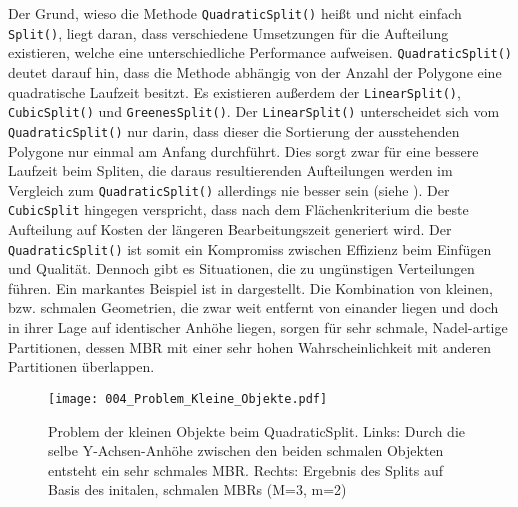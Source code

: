 \documentclass[runningheads,a4paper]{llncs}
\begin{document}
	Der Grund, wieso die Methode \texttt{QuadraticSplit()} heißt und nicht einfach \texttt{Split()}, liegt daran, dass verschiedene Umsetzungen für die Aufteilung existieren, welche eine unterschiedliche Performance aufweisen. \texttt{QuadraticSplit()} deutet darauf hin, dass die Methode abhängig von der Anzahl der Polygone eine quadratische Laufzeit besitzt. Es existieren außerdem der \texttt{LinearSplit()}, \texttt{CubicSplit()} und \texttt{GreenesSplit()}. Der \texttt{LinearSplit()} unterscheidet sich vom \texttt{QuadraticSplit()} nur darin, dass dieser die Sortierung der ausstehenden Polygone nur einmal am Anfang durchführt. Dies sorgt zwar für eine bessere Laufzeit beim Spliten, die daraus resultierenden Aufteilungen werden im Vergleich zum \texttt{QuadraticSplit()} allerdings nie besser sein (siehe ). Der \texttt{CubicSplit} hingegen verspricht, dass nach dem Flächenkriterium die beste Aufteilung auf Kosten der längeren Bearbeitungszeit generiert wird. Der \texttt{QuadraticSplit()} ist somit ein Kompromiss zwischen Effizienz beim Einfügen und Qualität. Dennoch gibt es Situationen, die zu ungünstigen Verteilungen führen. Ein markantes Beispiel ist in  dargestellt. Die Kombination von kleinen, bzw. schmalen Geometrien, die zwar weit entfernt von einander liegen und doch in ihrer Lage auf identischer Anhöhe liegen, sorgen für sehr schmale, Nadel-artige Partitionen, dessen \acs{MBR} mit einer sehr hohen Wahrscheinlichkeit mit anderen Partitionen überlappen.
	\begin{figure}[H]
		\begin{center}
		\texttt{[image: 004\_Problem\_Kleine\_Objekte.pdf]}
		\caption{Problem der kleinen Objekte beim QuadraticSplit. Links: Durch die selbe Y-Achsen-Anhöhe zwischen den beiden schmalen Objekten entsteht ein sehr schmales \acs{MBR}. Rechts: Ergebnis des Splits auf Basis des initalen, schmalen \acs{MBR}s (\acs{M}=3, \acs{m}=2)}
		\label{fig:problem-tiny-object}
		\end{center}
	\end{figure}
\end{document}
